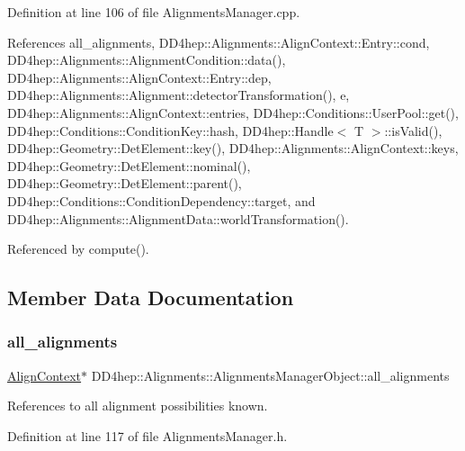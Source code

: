 Definition at line 106 of file Alignments\+Manager.\+cpp.



References all\+\_\+alignments, D\+D4hep\+::\+Alignments\+::\+Align\+Context\+::\+Entry\+::cond, D\+D4hep\+::\+Alignments\+::\+Alignment\+Condition\+::data(), D\+D4hep\+::\+Alignments\+::\+Align\+Context\+::\+Entry\+::dep, D\+D4hep\+::\+Alignments\+::\+Alignment\+::detector\+Transformation(), e, D\+D4hep\+::\+Alignments\+::\+Align\+Context\+::entries, D\+D4hep\+::\+Conditions\+::\+User\+Pool\+::get(), D\+D4hep\+::\+Conditions\+::\+Condition\+Key\+::hash, D\+D4hep\+::\+Handle$<$ T $>$\+::is\+Valid(), D\+D4hep\+::\+Geometry\+::\+Det\+Element\+::key(), D\+D4hep\+::\+Alignments\+::\+Align\+Context\+::keys, D\+D4hep\+::\+Geometry\+::\+Det\+Element\+::nominal(), D\+D4hep\+::\+Geometry\+::\+Det\+Element\+::parent(), D\+D4hep\+::\+Conditions\+::\+Condition\+Dependency\+::target, and D\+D4hep\+::\+Alignments\+::\+Alignment\+Data\+::world\+Transformation().



Referenced by compute().



\subsection{Member Data Documentation}
\hypertarget{class_d_d4hep_1_1_alignments_1_1_alignments_manager_object_ace0f6d572f7c1432436db1aab7a82dca}{}\label{class_d_d4hep_1_1_alignments_1_1_alignments_manager_object_ace0f6d572f7c1432436db1aab7a82dca} 
\subsubsection{\texorpdfstring{all\+\_\+alignments}{all\_alignments}}
{\footnotesize\ttfamily \hyperlink{class_d_d4hep_1_1_alignments_1_1_align_context}{Align\+Context}$\ast$ D\+D4hep\+::\+Alignments\+::\+Alignments\+Manager\+Object\+::all\+\_\+alignments}



References to all alignment possibilities known. 



Definition at line 117 of file Alignments\+Manager.\+h.



